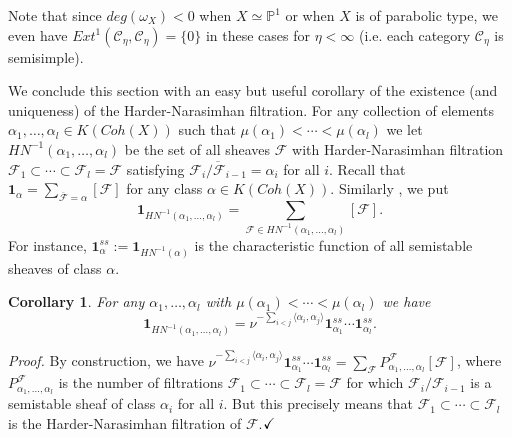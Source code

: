 \documentclass[a4paper,10pt]{amsart}
\def\qed{$\hfill \checkmark$}
\def\a{\alpha}
\newtheorem{cor}[theo]{Corollary}
\numberwithin{equation}{section}
\begin{document}
{\vspace{.3in}

Note that since $deg(\omega_X) <0$ when $X \simeq \mathbb{P}^1$ or when $X$ is of parabolic type,  we even have $Ext^1(\mathcal{C}_{\eta},\mathcal{C}_{\eta})=\{0\}$ in these cases for $\eta < \infty$ (i.e. each category $\mathcal{C}_{\eta}$ is semisimple).

\vspace{.15in}

We conclude this section with an easy but useful corollary of the existence (and uniqueness) of the Harder-Narasimhan filtration. For any collection of elements
$\a_1, \ldots, \a_l \in K(Coh(X))$ such that $\mu(\a_1) < \cdots < \mu(\a_l)$ we let $HN^{-1}(\a_1, \ldots, \a_l)$ be the set of all sheaves $\mathcal{F}$ with Harder-Narasimhan
filtration $\mathcal{F}_1 \subset \cdots \subset \mathcal{F}_l=\mathcal{F}$ satisfying $\overline{\mathcal{F}_i/\mathcal{F}_{i-1}}=\a_i$ for all $i$. Recall that $\mathbf{1}_{\a}
=\sum_{\overline{\mathcal{F}}=\a} [\mathcal{F}]$ for any class $\a \in K(Coh(X))$. Similarly , we put
$$\mathbf{1}_{HN^{-1}(\a_1, \ldots, \a_l)}=\sum_{\mathcal{F} \in HN^{-1}(\a_1, \ldots, \a_l)} [\mathcal{F}].$$
For instance, $\mathbf{1}^{ss}_{\a}:=\mathbf{1}_{HN^{-1}(\a)}$ is the characteristic function of all semistable sheaves of class $\a$.

\vspace{.1in}

\begin{cor}\label{C:ssumr} For any $\a_1, \ldots, \a_l$ with $\mu(\a_1) < \cdots < \mu(\a_l)$ we have
$$\mathbf{1}_{HN^{-1}(\a_1, \ldots, \a_l)}=\nu^{-\sum_{i<j} \langle \a_i, \a_j\rangle}\mathbf{1}^{ss}_{\a_1} \cdots \mathbf{1}^{ss}_{\a_l}.$$
\end{cor}
\noindent
\textit{Proof.} By construction, we have $\nu^{-\sum_{i<j} \langle \a_i, \a_j\rangle}\mathbf{1}^{ss}_{\a_1} \cdots \mathbf{1}^{ss}_{\a_l}=\sum_{\mathcal{F}} P^{\mathcal{F}}_{\a_1, \ldots, \a_l} [\mathcal{F}]$, where $P^\mathcal{F}_{\a_1, \ldots, \a_l}$ is the number of filtrations $\mathcal{F}_1 \subset \cdots \subset \mathcal{F}_l=\mathcal{F}$ for which $\mathcal{F}_i/\mathcal{F}_{i-1}$ is a semistable sheaf of class $\a_i$ for all $i$. But this precisely means that $\mathcal{F}_1 \subset \cdots \subset \mathcal{F}_l$ is the Harder-Narasimhan filtration of $\mathcal{F}$.\qed

\vspace{.1in}

}
\end{document}
